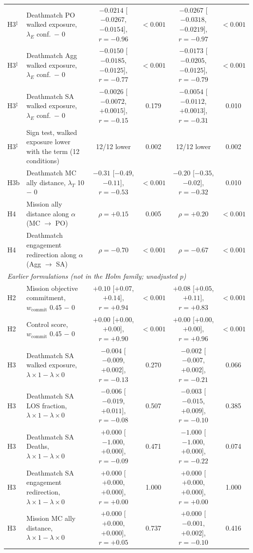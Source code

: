 \begin{tabular}{llcccc}
H3$^{\ddagger}$ & Deathmatch PO walked exposure, $\lambda_E$ conf.\ $-$ 0 & $-0.0214$ [$-0.0267$, $-0.0154$], $r=-0.96$ & $<0.001$ & $-0.0267$ [$-0.0318$, $-0.0219$], $r=-0.97$ & $<0.001$ \\
H3$^{\ddagger}$ & Deathmatch Agg walked exposure, $\lambda_E$ conf.\ $-$ 0 & $-0.0150$ [$-0.0185$, $-0.0125$], $r=-0.77$ & $<0.001$ & $-0.0173$ [$-0.0205$, $-0.0125$], $r=-0.79$ & $<0.001$ \\
H3$^{\ddagger}$ & Deathmatch SA walked exposure, $\lambda_E$ conf.\ $-$ 0 & $-0.0026$ [$-0.0072$, $+0.0015$], $r=-0.15$ & 0.179 & $-0.0054$ [$-0.0112$, $+0.0013$], $r=-0.31$ & 0.010 \\
H3$^{\ddagger}$ & Sign test, walked exposure lower with the term (12 conditions) & 12/12 lower & 0.002 & 12/12 lower & 0.002 \\
H3b & Deathmatch MC ally distance, $\lambda_T$ 10 $-$ 0 & $-0.31$ [$-0.49$, $-0.11$], $r=-0.53$ & $<0.001$ & $-0.20$ [$-0.35$, $-0.02$], $r=-0.32$ & 0.010 \\
H4 & Mission ally distance along $\alpha$ (MC $\to$ PO) & $\rho=+0.15$ & 0.005 & $\rho=+0.20$ & $<0.001$ \\
H4 & Deathmatch engagement redirection along $\alpha$ (Agg $\to$ SA) & $\rho=-0.70$ & $<0.001$ & $\rho=-0.67$ & $<0.001$ \\
\midrule
\multicolumn{6}{l}{\emph{Earlier formulations (not in the Holm family; unadjusted $p$)}} \\
H2 & Mission objective commitment, $w_{\mathrm{commit}}$ 0.45 $-$ 0 & $+0.10$ [$+0.07$, $+0.14$], $r=+0.94$ & $<0.001$ & $+0.08$ [$+0.05$, $+0.11$], $r=+0.83$ & $<0.001$ \\
H2 & Control score, $w_{\mathrm{commit}}$ 0.45 $-$ 0 & $+0.00$ [$+0.00$, $+0.00$], $r=+0.90$ & $<0.001$ & $+0.00$ [$+0.00$, $+0.00$], $r=+0.96$ & $<0.001$ \\
H3 & Deathmatch SA walked exposure, $\lambda\times1-\lambda\times0$ & $-0.004$ [$-0.009$, $+0.002$], $r=-0.13$ & 0.270 & $-0.002$ [$-0.007$, $+0.002$], $r=-0.21$ & 0.066 \\
H3 & Deathmatch SA LOS fraction, $\lambda\times1-\lambda\times0$ & $-0.006$ [$-0.019$, $+0.011$], $r=-0.08$ & 0.507 & $-0.003$ [$-0.015$, $+0.009$], $r=-0.10$ & 0.385 \\
H3 & Deathmatch SA Deaths, $\lambda\times1-\lambda\times0$ & $+0.000$ [$-1.000$, $+0.000$], $r=-0.09$ & 0.471 & $-1.000$ [$-1.000$, $+0.000$], $r=-0.22$ & 0.074 \\
H3 & Deathmatch SA engagement redirection, $\lambda\times1-\lambda\times0$ & $+0.000$ [$+0.000$, $+0.000$], $r=+0.00$ & 1.000 & $+0.000$ [$+0.000$, $+0.000$], $r=+0.00$ & 1.000 \\
H3 & Mission MC ally distance, $\lambda\times1-\lambda\times0$ & $+0.000$ [$+0.000$, $+0.000$], $r=+0.05$ & 0.737 & $+0.000$ [$-0.001$, $+0.002$], $r=-0.10$ & 0.416 \\
\bottomrule
\end{tabular}
